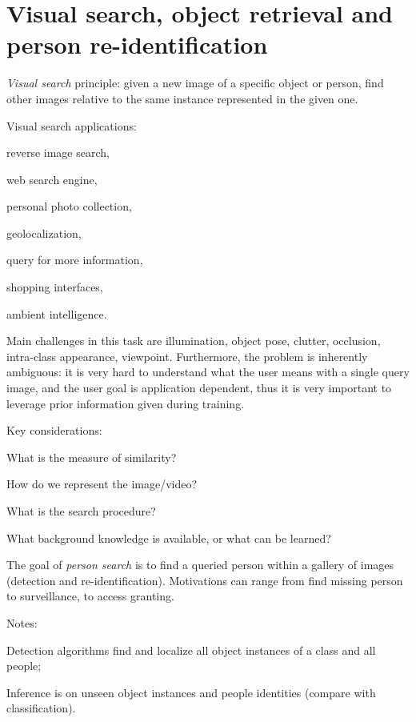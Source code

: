 \section{Visual search, object retrieval and person re-identification}\label{sec:visual-search}

\textit{Visual search} principle: given a new image of a specific object or person, find other images relative to the same instance represented in the given one.

Visual search applications:
\begin{myitem}
    \item reverse image search,
    \item web search engine,
    \item personal photo collection,
    \item geolocalization,
    \item query for more information,
    \item shopping interfaces,
    \item ambient intelligence.
\end{myitem}

Main challenges in this task are illumination, object pose, clutter, occlusion, intra-class appearance, viewpoint. Furthermore, the problem is inherently ambiguous: it is very hard to understand what the user means with a single query image, and the user goal is application dependent, thus it is very important to leverage prior information given during training.

Key considerations:
\begin{myitem}
    \item What is the measure of similarity?
    \item How do we represent the image/video?
    \item What is the search procedure?
    \item What background knowledge is available, or what can be learned?
\end{myitem}

The goal of \textit{person search} is to find a queried person within a gallery of images (detection and re-identification). Motivations can range from find missing person to surveillance, to access granting.

Notes:
\begin{myitem}
    \item Detection algorithms find and localize all object instances of a class and all people;
    \item Inference is on unseen object instances and people identities (compare with classification).
\end{myitem}


